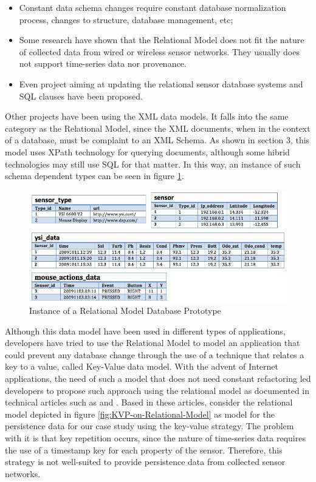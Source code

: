\begin{itemize}
  \item Constant data schema changes require constant database normalization
  process, changes to structure, database management, etc;
  \item Some research have shown that the Relational Model does not fit the
  nature of collected data from wired or wireless sensor networks. They usually
  does not support time-series data nor provenance.
  \item Even project aiming at updating the relational sensor database systems
  and SQL clauses have been proposed. 
\end{itemize}

Other projects have been using the XML data models. It falls into the same
category as the Relational Model, since the XML documents, when in the context
of a database, must be complaint to an XML Schema. As shown in section 3, this
model uses XPath technology for querying documents, although some hibrid
technologies may still use SQL for that matter. In this way, an instance of
such schema dependent types can be seen in figure
\ref{fig:persistence-example-relational}.

\begin{figure}[!h]
  \centering
  \includegraphics[scale=0.65]{../diagrams/persistence-example-relational}
  \caption{Instance of a Relational Model Database Prototype}
  \label{fig:persistence-example-relational}
\end{figure}

Although this data model have been used in different types of applications,
developers have tried to use the Relational Model to model an application that
could prevent any database change through the use of a technique that relates a
key to a value, called Key-Value data model. With the advent of Internet
applications, the need of such a model that does not need constant refactoring
led developers to propose such approach using the relational model as
documented in technical articles such as \cite{db-kvp-in-relational01} and
\cite{db-kvp-in-relational02}. Based in these articles, consider the relational
model depicted in figure \ref{fig:KVP-on-Relational-Model} as model for the
persistence data for our case study using the key-value strategy. The problem
with it is that key repetition occurs, since the nature of time-series data
requires the use of a timestamp key for each property of the sensor. Therefore,
this strategy is not well-suited to provide persistence data from collected
sensor networks.


